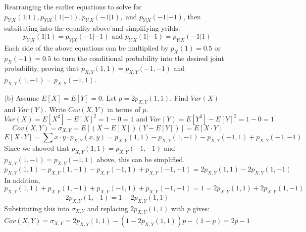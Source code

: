 \documentclass{report}
\begin{document}
\begin{enumerate}
\begin{itemize}
Rearranging the earlier equations to solve for $p_{Y|X}(1|1),p_{Y|X}(1|-1),p_{Y|X}(-1|1),\text{ and }p_{Y|X}(-1|-1)$, then subsituting into the equality above and simplifying yeilds:
$$p_{Y|X}(1|1)  = p_{Y|X}(-1|-1) \text{ and } p_{Y|X}(1|-1) =p_{Y|X}(-1|1)$$
Each side of the above equations can be multiplied by $p_X(1) = 0.5$ or $p_X(-1) = 0.5$ to turn the conditional probability into the desired joint probability, proving that $p_{X,Y}(1,1) = p_{X,Y}(-1,-1)$ and $p_{X,Y}(1,-1) = p_{X,Y}(-1,1)$.
\item[(b)] Assume $E[X] = E[Y] = 0$. Let $p=2p_{X,Y}(1,1)$. Find $Var(X)$ and $Var(Y)$. Write $Cov(X,Y)$ in terms of $p$.\\
$$Var(X) =  E[X^2]-E[X]^2 = 1-0 = 1 \text{ and }Var(Y) =  E[Y^2]-E[Y]^2 = 1-0 = 1$$
$$Cov(X,Y) = \sigma_{X,Y}=E[(X-E[X])(Y-E[Y])] = E[X \cdot Y]$$
$$ E[X \cdot Y]= \sum x\cdot y \cdot p_{X,Y}(x,y) = p_{X,Y}(1,1)-p_{X,Y}(1,-1)-p_{X,Y}(-1,1)+p_{X,Y}(-1,-1)$$
Since we showed that $p_{X,Y}(1,1) = p_{X,Y}(-1,-1)$ and $p_{X,Y}(1,-1) = p_{X,Y}(-1,1)$ above, this can be simplified.
$$p_{X,Y}(1,1)-p_{X,Y}(1,-1)-p_{X,Y}(-1,1)+p_{X,Y}(-1,-1) = 2 p_{X,Y}(1,1) - 2 p_{X,Y}(1,-1)$$
In addition,
$$ p_{X,Y}(1,1)+p_{X,Y}(1,-1)+p_{X,Y}(-1,1)+p_{X,Y}(-1,-1) = 1 = 2 p_{X,Y}(1,1) + 2 p_{X,Y}(1,-1)$$
$$2 p_{X,Y}(1,-1) = 1-2 p_{X,Y}(1,1)$$
Substituting this into $\sigma_{X,Y}$ and replacing $2 p_{X,Y}(1,1)$ with $p$ gives:
$$Cov(X,Y) = \sigma_{X,Y}= 2 p_{X,Y}(1,1)-(1-2 p_{X,Y}(1,1)) p-(1-p)= 2p-1$$
\end{itemize}



\end{enumerate}
\end{document}
